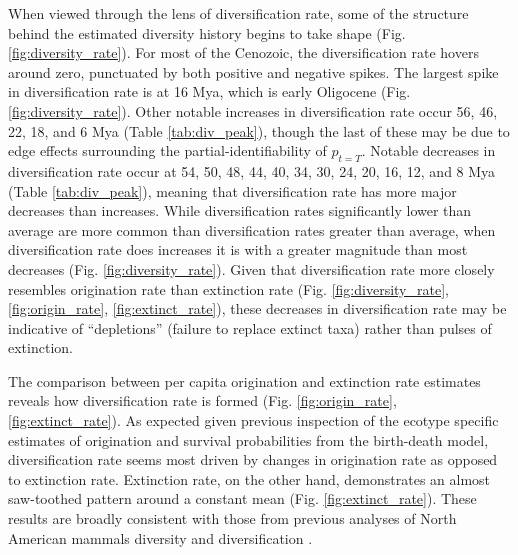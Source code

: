 \documentclass[12pt,letterpaper]{article}
\begin{document}
When viewed through the lens of diversification rate, some of the structure behind the estimated diversity history begins to take shape (Fig. \ref{fig:diversity_rate}). For most of the Cenozoic, the diversification rate hovers around zero, punctuated by both positive and negative spikes. The largest spike in diversification rate is at 16 Mya, which is early Oligocene (Fig. \ref{fig:diversity_rate}). Other notable increases in diversification rate occur 56, 46, 22, 18, and 6 Mya (Table \ref{tab:div_peak}), though the last of these may be due to edge effects surrounding the partial-identifiability of \(p_{t = T}\). Notable decreases in diversification rate occur at 54, 50, 48, 44, 40, 34, 30, 24, 20, 16, 12, and 8 Mya (Table \ref{tab:div_peak}), meaning that diversification rate has more major decreases than increases. While diversification rates significantly lower than average are more common than diversification rates greater than average, when diversification rate does increases it is with a greater magnitude than most decreases (Fig. \ref{fig:diversity_rate}). Given that diversification rate more closely resembles origination rate than extinction rate (Fig. \ref{fig:diversity_rate}, \ref{fig:origin_rate}, \ref{fig:extinct_rate}), these decreases in diversification rate may be indicative of ``depletions'' (failure to replace extinct taxa) rather than pulses of extinction.

The comparison between per capita origination and extinction rate estimates reveals how diversification rate is formed (Fig. \ref{fig:origin_rate}, \ref{fig:extinct_rate}). As expected given previous inspection of the ecotype specific estimates of origination and survival probabilities from the birth-death model, diversification rate seems most driven by changes in origination rate as opposed to extinction rate. Extinction rate, on the other hand, demonstrates an almost saw-toothed pattern around a constant mean (Fig. \ref{fig:extinct_rate}). These results are broadly consistent with those from previous analyses of North American mammals diversity and diversification \citep{Alroy1996a,Alroy2000g,Alroy2009}.
\end{document}
